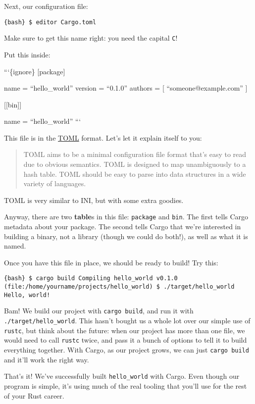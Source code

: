 \documentclass[]{article}
\begin{document}
Next, our configuration file:

\texttt{\{bash\} \$ editor Cargo.toml}

Make sure to get this name right: you need the capital \texttt{C}!

Put this inside:

```\{ignore\} {[}package{]}

name = ``hello\_world'' version = ``0.1.0'' authors = {[}
``someone@example.com'' {]}

{[}{[}bin{]}{]}

name = ``hello\_world'' ```

This file is in the \href{https://github.com/toml-lang/toml}{TOML}
format. Let's let it explain itself to you:

\begin{quote}
TOML aims to be a minimal configuration file format that's easy to read
due to obvious semantics. TOML is designed to map unambiguously to a
hash table. TOML should be easy to parse into data structures in a wide
variety of languages.
\end{quote}

TOML is very similar to INI, but with some extra goodies.

Anyway, there are two \textbf{table}s in this file: \texttt{package} and
\texttt{bin}. The first tells Cargo metadata about your package. The
second tells Cargo that we're interested in building a binary, not a
library (though we could do both!), as well as what it is named.

Once you have this file in place, we should be ready to build! Try this:

\texttt{\{bash\} \$ cargo build    Compiling hello\_world v0.1.0 (file:/home/yourname/projects/hello\_world) \$ ./target/hello\_world Hello, world!}

Bam! We build our project with \texttt{cargo build}, and run it with
\texttt{./target/hello\_world}. This hasn't bought us a whole lot over
our simple use of \texttt{rustc}, but think about the future: when our
project has more than one file, we would need to call \texttt{rustc}
twice, and pass it a bunch of options to tell it to build everything
together. With Cargo, as our project grows, we can just
\texttt{cargo build} and it'll work the right way.

That's it! We've successfully built \texttt{hello\_world} with Cargo.
Even though our program is simple, it's using much of the real tooling
that you'll use for the rest of your Rust career.
\end{document}
